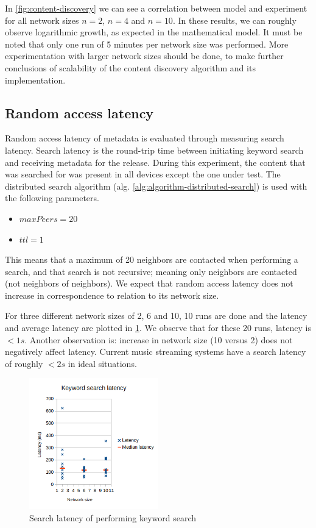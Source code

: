 In \ref{fig:content-discovery} we can see a correlation between model and experiment for all network sizes $n=2$, $n=4$ and $n=10$. In these results, we can roughly observe logarithmic growth, as expected in the mathematical model. It must be noted that only one run of 5 minutes per network size was performed. More experimentation with larger network sizes should be done, to make further conclusions of scalability of the content discovery algorithm and its implementation.

\subsection{Random access latency}
Random access latency of metadata is evaluated through measuring search latency. Search latency is the round-trip time between initiating keyword search and receiving metadata for the release. During this experiment, the content that was searched for was present in all devices except the one under test. The distributed search algorithm (alg. \ref{alg:algorithm-distributed-search}) is used with the following parameters.

\begin{itemize}
    \item $maxPeers=20$
    \item $ttl=1$ 
\end{itemize}

This means that a maximum of 20 neighbors are contacted when performing a search, and that search is not recursive; meaning only neighbors are contacted (not neighbors of neighbors). We expect that random access latency does not increase in correspondence to relation to its network size.

For three different network sizes of 2, 6 and 10, 10 runs are done and the latency and average latency are plotted in \ref{fig:search-latency}. We observe that for these 20 runs, latency is $<1s$. Another observation is: increase in network size (10 versus 2) does not negatively affect latency. Current music streaming systems have a search latency of roughly $<2s$ in ideal situations.

\begin{figure}
    \centering
    \includegraphics[width=0.5\textwidth]{evaluation/search-latency-2.png}
    \caption{Search latency of performing keyword search}
    \label{fig:search-latency}
\end{figure}

